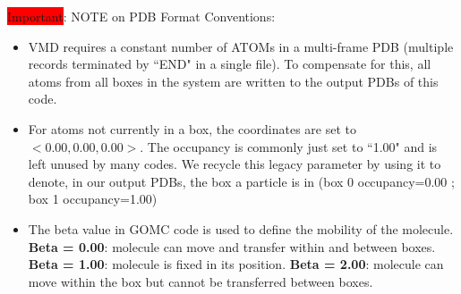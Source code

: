 \colorbox{red}{Important}: NOTE on PDB Format Conventions:
\begin{itemize}
\item VMD requires a constant number of ATOMs in a multi-frame PDB (multiple records terminated by ``END" in a single file). To compensate for this, all atoms from all boxes in the system are written to the output PDBs of this code.
\item For atoms not currently in a box, the coordinates are set to $<0.00, 0.00, 0.00>$. The occupancy is commonly just set to ``1.00" and is left unused by many codes. We recycle this legacy parameter by using it to denote, in our output PDBs, the box a particle is in (box 0  occupancy=0.00 ; box 1  occupancy=1.00)
\item{The beta value in GOMC code is used to define the mobility of the molecule. }
	\subitem \textbf{Beta  = 0.00}: molecule can move and transfer within and between boxes.
	\subitem \textbf{Beta = 1.00}: molecule is fixed in its position.
	\subitem \textbf{Beta = 2.00}: molecule can move within the box but cannot be transferred   between boxes.
\end{itemize} 

